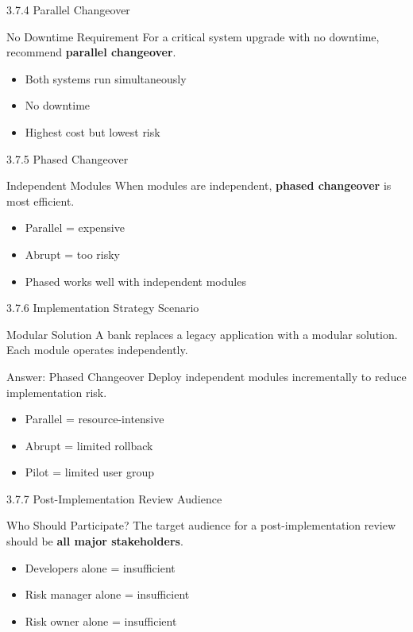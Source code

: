 \documentclass{beamer}
\begin{document}
	\begin{frame}{3.7.4 Parallel Changeover}
		\begin{block}{No Downtime Requirement}
			For a critical system upgrade with no downtime, recommend \textbf{parallel changeover}.
		\end{block}
		\begin{itemize}
			\item Both systems run simultaneously
			\item No downtime
			\item Highest cost but lowest risk
		\end{itemize}
	\end{frame}
	
	\begin{frame}{3.7.5 Phased Changeover}
		\begin{block}{Independent Modules}
			When modules are independent, \textbf{phased changeover} is most efficient.
		\end{block}
		\begin{itemize}
			\item Parallel = expensive
			\item Abrupt = too risky
			\item Phased works well with independent modules
		\end{itemize}
	\end{frame}
	
	\begin{frame}{3.7.6 Implementation Strategy Scenario}
		\begin{block}{Modular Solution}
			A bank replaces a legacy application with a modular solution. Each module operates independently.
		\end{block}
		\begin{exampleblock}{Answer: Phased Changeover}
			Deploy independent modules incrementally to reduce implementation risk.
		\end{exampleblock}
		\begin{itemize}
			\item Parallel = resource-intensive
			\item Abrupt = limited rollback
			\item Pilot = limited user group
		\end{itemize}
	\end{frame}
	
	\begin{frame}{3.7.7 Post-Implementation Review Audience}
		\begin{block}{Who Should Participate?}
			The target audience for a post-implementation review should be \textbf{all major stakeholders}.
		\end{block}
		\begin{itemize}
			\item Developers alone = insufficient
			\item Risk manager alone = insufficient
			\item Risk owner alone = insufficient
		\end{itemize}
	\end{frame}
	
\end{document}
